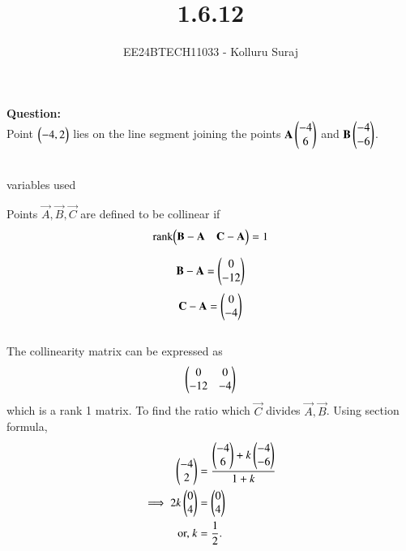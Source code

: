 \documentclass[journal]{IEEEtran}
\begin{document}

\vspace{3cm}

\title{1.6.12}
\author{EE24BTECH11033 - Kolluru Suraj}
{\let\newpage\relax\maketitle}
\renewcommand{\thefigure}{\theenumi}
\renewcommand{\thetable}{\theenumi}
\setlength{\intextsep}{10pt} %
\renewcommand{\thetable}{\theenumi}
\textbf{Question:}\\
Point $ \begin{pmatrix}-4, 2\end{pmatrix}$ lies on the line segment joining the points $\mathbf{A}\begin{pmatrix}-4\\ 6\end{pmatrix}$  and  $\mathbf{B}\begin{pmatrix}-4\\ -6\end{pmatrix}$.
\\
\solution\\
\begin{table}[h!]
  \centering
  
  \caption{variables used}
  \label{tabQuestion-1.6.12}
\end{table}


Points $\vec{A}, \vec{B}, \vec{C}$ are defined to be collinear if 
		\begin{align}
			\label{eq:line-rank-2}
			\text{rank}{\ensuremath{\begin{pmatrix}\mathbf{B}-\mathbf{A}& \mathbf{C}-\mathbf{A}\end{pmatrix}}} = 1
		\end{align}

  \begin{align}
 \mathbf{B}-\mathbf{A}=\begin{pmatrix} 0\\ -12\end{pmatrix}
\end{align}
\begin{align}
 \mathbf{C}-\mathbf{A}=\begin{pmatrix} 0\\ -4\end{pmatrix}
\end{align}\\
The collinearity matrix can be expressed as
 \begin{align}
			    \begin{pmatrix}0 & 0\\-12 & -4 \end{pmatrix}  
\end{align}
which is a rank 1 matrix.
To find the ratio which $\vec{C}$ divides $\vec{A},\vec{B}$. Using section formula,
\begin{align}
         \begin{pmatrix}-4\\2\end{pmatrix} &=\frac{{\begin{pmatrix}-4\\6\end{pmatrix}+k\begin{pmatrix}-4\\-6\end{pmatrix}}}{1+k}\\
	 \implies 2k\begin{pmatrix}0 \\ 4\end{pmatrix} &=\begin{pmatrix}0 \\ 4\end{pmatrix}
	 \\
	 \text{or, } k &= \frac{1}{2}.
\end{align}
\end{document}

